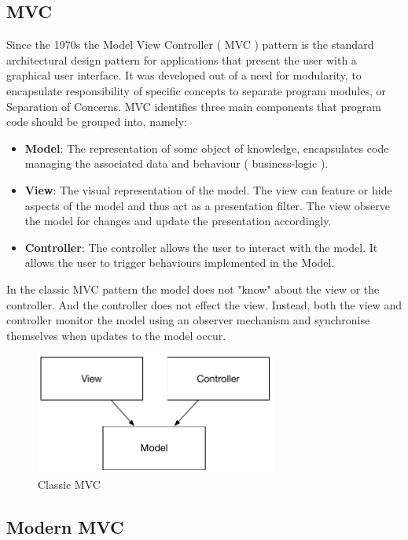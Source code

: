 \subsection{MVC}
Since the 1970s the Model View Controller ( MVC ) pattern is the standard architectural design pattern for applications that present the user with a graphical user interface. It was developed out of a need for modularity, to encapsulate responsibility of specific concepts to separate program modules, or Separation of Concerns. MVC identifies three main components that program code should be grouped into, namely\cite{walther_2016}:

\begin{itemize}[label={}]

\item \textbf{Model}: The representation of some object of knowledge, encapsulates code managing the associated data and behaviour ( business-logic ).
\item \textbf{View}: The visual representation of the model. The view can feature or hide aspects of the model and thus act as a presentation filter. The view observe the model for changes and update the presentation accordingly.
\item \textbf{Controller}: The controller allows the user to interact with the model. It allows the user to trigger behaviours implemented in the Model.

\end{itemize}

In the classic MVC pattern the model does not "know" about the view or the controller. And the controller does not effect the view. Instead, both the view and controller monitor the model using an observer mechanism and synchronise themselves when updates to the model occur.

\begin{figure}[H]
    \centering
    \includegraphics[height=4cm,keepaspectratio]{assets/concept/mvc_1.pdf}
    \caption{Classic MVC}
    \label{fig:mvc_1}
\end{figure}

\subsection{Modern MVC}

